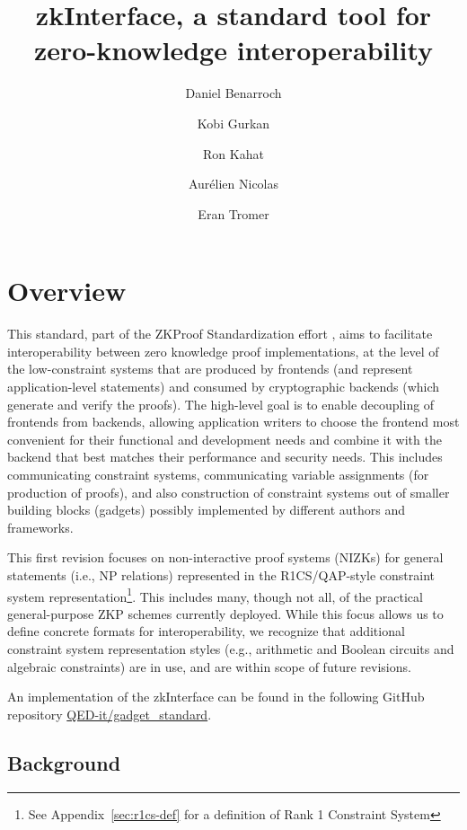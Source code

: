 \documentclass[a4paper,12pt]{article}
\title{zkInterface, a standard tool for zero-knowledge interoperability}
\author[1]{Daniel Benarroch}
\author[1]{Kobi Gurkan}
\author[1]{Ron Kahat}
\author[1]{Aurélien Nicolas}
\author[2]{Eran Tromer}
\affil[1]{QED-it}
\affil[2]{QED-it, Columbia University, Tel Aviv University}
\newcommand{\enote}[1]{\dtcolornote[Eran]{darkgreen}{#1}}
\begin{document}
\maketitle



\tableofcontents
\pagebreak
\section{Overview}
This standard, part of the ZKProof Standardization effort \cite{ZKProofSecurity, ZKProofImplementation, ZKProofApplications}, aims to facilitate interoperability between zero knowledge proof implementations, at the level of the low-constraint systems that are produced by frontends (and represent application-level statements) and consumed by cryptographic backends (which generate and verify the proofs). The high-level goal is to enable decoupling of frontends from backends, allowing application writers to choose the frontend most convenient for their functional and development needs and combine it with the backend that best matches their performance and security needs. This includes communicating constraint systems, communicating variable assignments (for production of proofs), and also construction of constraint systems out of smaller building blocks (gadgets) possibly implemented by different authors and frameworks.

This first revision focuses on non-interactive proof systems (NIZKs) for general statements (i.e., NP relations) represented in the R1CS/QAP-style constraint system representation\footnote{See Appendix~\ref{sec:r1cs-def} for a definition of Rank 1 Constraint System}. This includes many, though not all, of the practical general-purpose ZKP schemes currently deployed. While this focus allows us to define concrete formats for interoperability, we recognize that additional constraint system representation styles (e.g., arithmetic and Boolean circuits and algebraic constraints) are in use, and are within scope of future revisions.

An implementation of the zkInterface can be found in the following GitHub repository \href{https://github.com/QED-it/gadget_standard}{QED-it/gadget\_standard}.
\subsection{Background}
\end{document}

